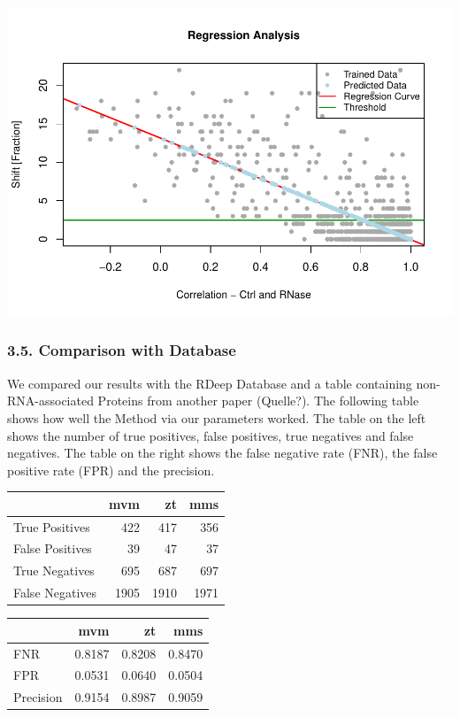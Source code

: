 \documentclass[
  12pt,
]{article}
\begin{document}
\includegraphics{final_files/figure-latex/unnamed-chunk-5-1.pdf}

\hypertarget{comparison-with-database}{%
\subsubsection{3.5. Comparison with
Database}\label{comparison-with-database}}

We compared our results with the RDeep Database and a table containing
non-RNA-associated Proteins from another paper (Quelle?). The following
table shows how well the Method via our parameters worked. The table on
the left shows the number of true positives, false positives, true
negatives and false negatives. The table on the right shows the false
negative rate (FNR), the false positive rate (FPR) and the precision.

\begin{table}
\centering
\begin{tabular}{l|r|r|r}
\hline
  & mvm & zt & mms\\
\hline
True Positives & 422 & 417 & 356\\
\hline
False Positives & 39 & 47 & 37\\
\hline
True Negatives & 695 & 687 & 697\\
\hline
False Negatives & 1905 & 1910 & 1971\\
\hline
\end{tabular}
\end{table}

\begin{table}
\centering
\begin{tabular}{l|r|r|r}
\hline
  & mvm & zt & mms\\
\hline
FNR & 0.8187 & 0.8208 & 0.8470\\
\hline
FPR & 0.0531 & 0.0640 & 0.0504\\
\hline
Precision & 0.9154 & 0.8987 & 0.9059\\
\hline
\end{tabular}
\end{table}
\end{document}
